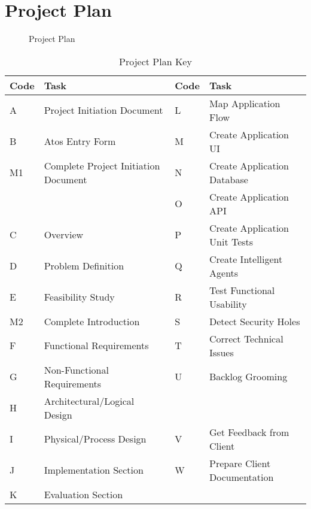 \section{Project Plan}

\begin{figure}
  \centering
  \begin{minipage}{14cm}
    \centering
    
    \caption{Project Plan}
    \label{fig:project_plan}
  \end{minipage}
\end{figure}

\begin{table}
  \caption[Project Plan Key]{Project Plan Key \hfill}
  \label{tab:runtime}
  \begin{tabular*}{14.0cm}{p{1.0cm}p{6.0cm}p{1.0cm}p{6.0cm}}
    \toprule
    Code & Task & Code & Task \\
    \midrule
    A & Project Initiation Document & L & Map Application Flow \\
    B & Atos Entry Form & M & Create Application UI \\
    M1 & Complete Project Initiation Document & N & Create Application Database \\
     & & O & Create Application API \\
    C & Overview & P & Create Application Unit Tests \\
    D & Problem Definition & Q & Create Intelligent Agents \\
    E & Feasibility Study & R & Test Functional Usability \\
    M2 & Complete Introduction & S & Detect Security Holes \\
    F & Functional Requirements & T & Correct Technical Issues \\
    G & Non-Functional Requirements & U & Backlog Grooming \\
    H & Architectural/Logical Design & & \\
    I & Physical/Process Design & V & Get Feedback from Client \\
    J & Implementation Section & W & Prepare Client Documentation \\
    K & Evaluation Section \\
    \bottomrule
  \end{tabular*}
\end{table}
